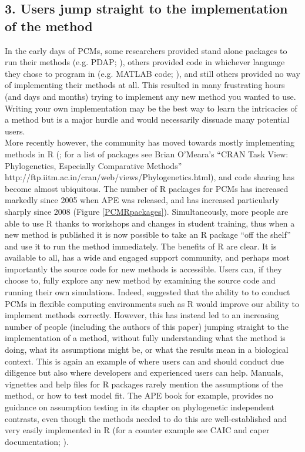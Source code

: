 \documentclass[a4paper,12pt]{article}
\begin{document}
  \subsection{3. Users jump straight to the implementation of the method}
    In the early days of PCMs, some researchers provided stand alone packages to run their methods (e.g. PDAP; \citealp{diaz1996testing}), others provided code in whichever language they chose to program in (e.g. MATLAB code; \citealp{rohlf2001comparative}), and still others provided no way of implementing their methods at all. 
    This resulted in many frustrating hours (and days and months) trying to implement any new method you wanted to use.
    Writing your own implementation may be the best way to learn the intricacies of a method but is a major hurdle and would necessarily dissuade many potential users.  \\

    More recently however, the community has moved towards mostly implementing methods in R (\citealp{R-Core-Team:2014aa}; for a list of packages see Brian O'Meara's ``CRAN Task View: Phylogenetics, Especially Comparative Methods'' http://ftp.iitm.ac.in/cran/web/views/Phylogenetics.html), and code sharing has become almost ubiquitous. 
    The number of R packages for PCMs has increased markedly since 2005 when APE \citep{Paradis:2004aa} was released, and has increased particularly sharply since 2008 (Figure \ref{PCMRpackages}).
    Simultaneously, more people are able to use R thanks to workshops and changes in student training, thus when a new method is published it is now possible to take an R package ``off the shelf'' and use it to run the method immediately.
    The benefits of R are clear. 
    It is available to all, has a wide and engaged support community, and perhaps most importantly the source code for new methods is accessible.
    Users can, if they choose to, fully explore any new method by examining the source code and running their own simulations. 
    Indeed, \citet{freckleton2009seven} suggested that the ability to to conduct PCMs in flexible computing environments such as R would improve our ability to implement methods correctly. 
    However, this has instead led to an increasing number of people (including the authors of this paper) jumping straight to the implementation of a method, without fully understanding what the method is doing, what its assumptions might be, or what the results mean in a biological context.
    This is again an example of where users can and should conduct due diligence but also where developers and experienced users can help.
    Manuals, vignettes and help files for R packages rarely mention the assumptions of the method, or how to test model fit. 
    The APE book \citep{paradis2011analysis} for example, provides no guidance on assumption testing in its chapter on phylogenetic independent contrasts, even though the methods needed to do this are well-established and very easily implemented in R (for a counter example see CAIC and caper documentation; \citealp{purvis1995comparative,Orme:2013aa}).
\end{document}
